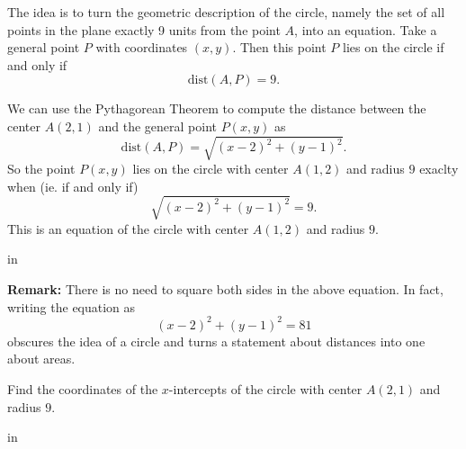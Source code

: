\documentclass{ximera}
\newcommand{\pskip}{\vskip 0.1 in}
\begin{document}
\begin{explanation}
The idea is to turn the geometric description of the circle, namely the set of all points in the plane exactly 9 units from the point $A$, into an equation. Take a general point $P$ with coordinates $(x,y)$. Then this point $P$ lies on the circle if and only if
\[
     \text{dist}(A,P) = 9 .
\]


\begin{onlineOnly}
    \begin{center}
\end{center}
\end{onlineOnly}

We can use the Pythagorean Theorem to compute the distance between the center $A(2,1)$ and the general point $P(x,y)$ as 
\[
 \text{dist}(A,P) =  \sqrt{(x-2)^2 + (y-1)^2} .
\]
So the point $P(x,y)$ lies on the circle with center $A(1,2)$ and radius $9$ exaclty when (ie. if and only if)
\[
     \sqrt{(x-2)^2 + (y-1)^2} = 9 .
\]
This is an equation of the circle with center $A(1,2)$ and radius $9$. 

\pskip

{\bf Remark:}  There is no need to square both sides in the above equation. In fact, writing the equation as
\[
      (x-2)^2 + (y-1)^2 = 81
\]
obscures the idea of a circle and turns a statement about distances into one about areas.


\iffalse   %

\begin{figure}[!h]
\centerline{
\texttt{[image: Circle1B.eps]}   
}
\end{figure}

\fi          %

\end{explanation}


\begin{example}   \label{Ex3}
Find the coordinates of the $x$-intercepts of the circle with center $A(2,1)$ and radius $9$. %
\end{example}

\pskip
\end{document}
